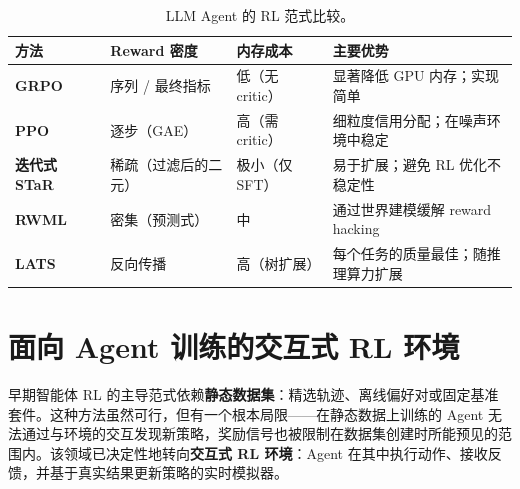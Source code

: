 \begin{table}[ht!]
\centering\small
\caption{LLM Agent 的 RL 范式比较。}
\noindent\begin{tabularx}{\linewidth}{@{}l Z{0.85} Z{0.47} Z{1.68}@{}}
\toprule
\textbf{方法} & \textbf{Reward 密度} & \textbf{内存成本} & \textbf{主要优势} \\
\midrule
\textbf{GRPO}~\cite{shao2024deepseekmath} & 序列 / 最终指标 & 低（无 critic） & 显著降低 GPU 内存；实现简单 \\
\textbf{PPO}~\cite{schulman2017proximal} & 逐步（GAE） & 高（需 critic） & 细粒度信用分配；在噪声环境中稳定 \\
\textbf{迭代式 STaR}~\cite{zelikman2022star} & 稀疏（过滤后的二元） & 极小（仅 SFT） & 易于扩展；避免 RL 优化不稳定性 \\
\textbf{RWML}~\cite{yu2026rwml} & 密集（预测式） & 中 & 通过世界建模缓解 reward hacking \\
\textbf{LATS}~\cite{zhou2024lats} & 反向传播 & 高（树扩展） & 每个任务的质量最佳；随推理算力扩展 \\
\bottomrule
\end{tabularx}
\end{table}

\section{面向 Agent 训练的交互式 RL 环境}
\label{sec:interactive-rl-envs}

早期智能体 RL 的主导范式依赖\textbf{静态数据集}：精选轨迹、离线偏好对或固定基准套件。这种方法虽然可行，但有一个根本局限——在静态数据上训练的 Agent 无法通过与环境的交互发现新策略，奖励信号也被限制在数据集创建时所能预见的范围内。该领域已决定性地转向\textbf{交互式 RL 环境}：Agent 在其中执行动作、接收反馈，并基于真实结果更新策略的实时模拟器。


